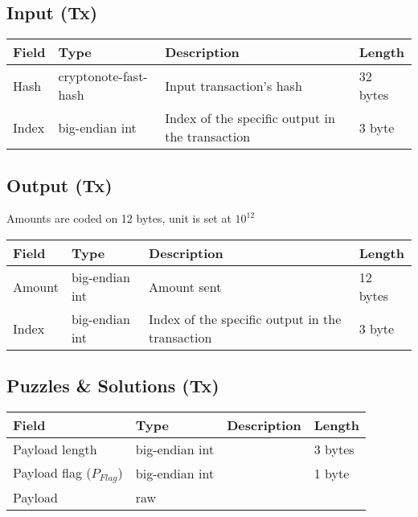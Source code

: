 \documentclass[a4paper,10pt]{article}
\begin{document}
        
        \subsection{Input (Tx)}
           \begin{tabularx}{\textwidth}{|l|l|X|l|}
            \hline Field & Type & Description & Length \\ \hline
            \hline Hash & cryptonote-fast-hash & Input transaction's hash & 32 bytes \\
            \hline Index & big-endian int & Index of the specific output in the transaction & 3 byte \\
            \hline 
            \end{tabularx}

        \subsection{Output (Tx)}
            Amounts are coded on 12 bytes, unit is set at $10^{12}$ \\
            
           \begin{tabularx}{\textwidth}{|l|l|X|l|}
            \hline Field & Type & Description & Length \\ \hline
            \hline Amount & big-endian int & Amount sent & 12 bytes \\
            \hline Index & big-endian int & Index of the specific output in the transaction & 3 byte \\
            \hline 
            \end{tabularx}

        \subsection{Puzzles \& Solutions (Tx)}
           \begin{tabularx}{\textwidth}{|l|l|X|l|}
            \hline Field & Type & Description & Length \\ \hline
            \hline Payload length & big-endian int &  & 3 bytes \\
            \hline Payload flag ($P_{Flag}$) & big-endian int &  & 1 byte \\
            \hline Payload & raw & & \\
            \hline
            \end{tabularx}
\end{document}

